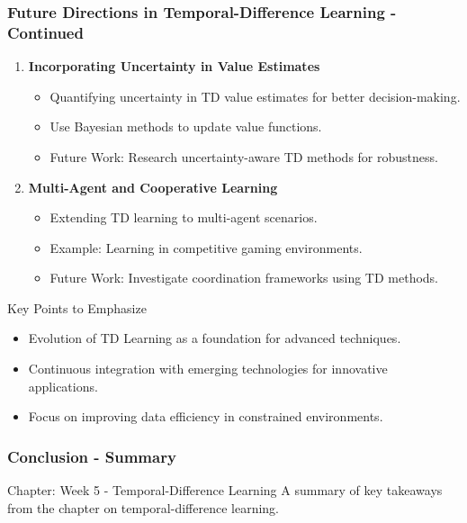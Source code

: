 \documentclass[aspectratio=169]{beamer}
\begin{document}
\begin{frame}[fragile]
    \frametitle{Future Directions in Temporal-Difference Learning - Continued}
    \begin{enumerate}[resume]
        \item \textbf{Incorporating Uncertainty in Value Estimates}
            \begin{itemize}
                \item Quantifying uncertainty in TD value estimates for better decision-making.
                \item Use Bayesian methods to update value functions.
                \item Future Work: Research uncertainty-aware TD methods for robustness.
            \end{itemize}

        \item \textbf{Multi-Agent and Cooperative Learning}
            \begin{itemize}
                \item Extending TD learning to multi-agent scenarios.
                \item Example: Learning in competitive gaming environments.
                \item Future Work: Investigate coordination frameworks using TD methods.
            \end{itemize}
    \end{enumerate}
    
    \begin{block}{Key Points to Emphasize}
        \begin{itemize}
            \item Evolution of TD Learning as a foundation for advanced techniques.
            \item Continuous integration with emerging technologies for innovative applications.
            \item Focus on improving data efficiency in constrained environments.
        \end{itemize}
    \end{block}
\end{frame}

\begin{frame}[fragile]
    \frametitle{Conclusion - Summary}
    \begin{block}{Chapter: Week 5 - Temporal-Difference Learning}
        A summary of key takeaways from the chapter on temporal-difference learning.
    \end{block}
\end{frame}
\end{document}
